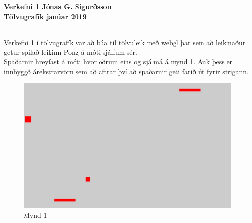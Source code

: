 \documentclass[12pt]{article}
\begin{document}
\noindent \large \textbf{Verkefni 1 \hfill Jónas G. Sigurðsson\\
\noindent Tölvugrafík \hfill 
\normalsize  \hfill janúar 2019}\\\\
\begin{small}

\begin{spacing}{2}
\end{spacing}
Verkefni 1 í tölvugrafík var að búa til tölvuleik með webgl þar sem að leikmaður getur spilað leikinn Pong á móti sjálfum sér.\\
Spaðarnir hreyfast á móti hvor öðrum eins og sjá má á mynd 1. Auk þess er innbyggð árekstrarvörn sem að aftrar því að spaðarnir geti farið út fyrir strigann.
\begin{figure}[h!]
	\centering
  	\includegraphics[scale=0.25]{3}
  	\caption{Mynd 1}
\end{figure}


\end{small}
\end{document}
